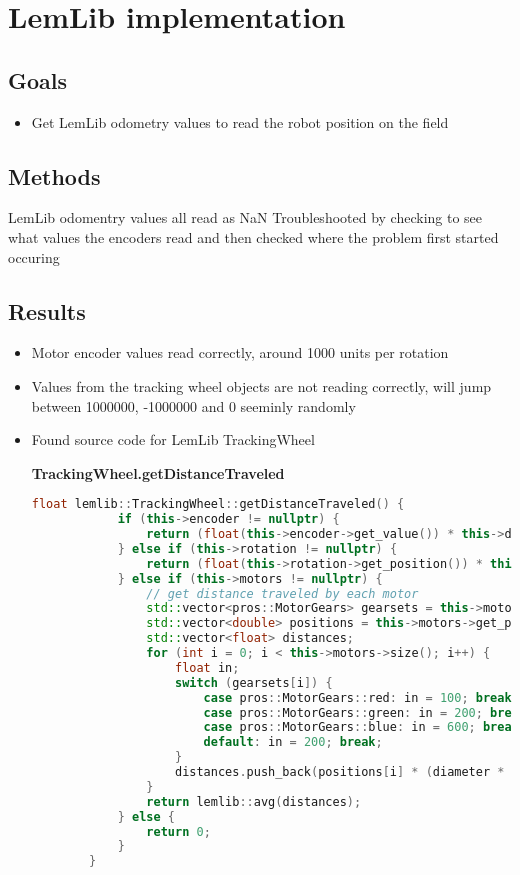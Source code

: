 \section{LemLib implementation}

\subsection{Goals}
\begin{itemize}
    \item Get LemLib odometry values to read the robot position on the field
\end{itemize}

\subsection{Methods}
LemLib odomentry values all read as NaN
Troubleshooted by checking to see what values the encoders read and then checked where the problem first started occuring

\subsection{Results}
\begin{itemize}
    \item Motor encoder values read correctly, around 1000 units per rotation
    \item Values from the tracking wheel objects are not reading correctly, will jump between 1000000, -1000000 and 0 seeminly randomly
    \item Found source code for LemLib TrackingWheel
    
    \textbf{TrackingWheel.getDistanceTraveled}
    \begin{lstlisting}[language=c++]
        float lemlib::TrackingWheel::getDistanceTraveled() {
            if (this->encoder != nullptr) {
                return (float(this->encoder->get_value()) * this->diameter * M_PI / 360) / this->gearRatio;
            } else if (this->rotation != nullptr) {
                return (float(this->rotation->get_position()) * this->diameter * M_PI / 36000) / this->gearRatio;
            } else if (this->motors != nullptr) {
                // get distance traveled by each motor
                std::vector<pros::MotorGears> gearsets = this->motors->get_gearing_all();
                std::vector<double> positions = this->motors->get_position_all();
                std::vector<float> distances;
                for (int i = 0; i < this->motors->size(); i++) {
                    float in;
                    switch (gearsets[i]) {
                        case pros::MotorGears::red: in = 100; break;
                        case pros::MotorGears::green: in = 200; break;
                        case pros::MotorGears::blue: in = 600; break;
                        default: in = 200; break;
                    }
                    distances.push_back(positions[i] * (diameter * M_PI) * (rpm / in));
                }
                return lemlib::avg(distances);
            } else {
                return 0;
            }
        }
    \end{lstlisting}
\end{itemize}

